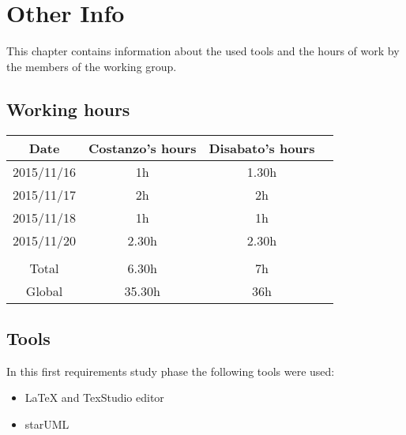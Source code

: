 \documentclass[\mainpath/main]{subfiles}
\begin{document}
\chapter{Other Info}
\label{other_info}

\setmyfancystyle

This chapter contains information about the used tools and the hours of work by the members of the working group.

\section{Working hours}
\begin{table}[h!]
\begin{tabular}{cccc}
\hline
Date & Costanzo's hours & Disabato's hours  &    \\ \hline
2015/11/16 & 1h & 1.30h &    \\ \hline
2015/11/17 & 2h & 2h &    \\ \hline 
2015/11/18 & 1h & 1h &    \\ \hline
2015/11/20 & 2.30h & 2.30h &    \\ \hline \\
Total & 6.30h & 7h & \\ \hline
Global & 35.30h & 36h & \\ \hline

\end{tabular}
\end{table}

\section{Tools}
In this first requirements study phase the following tools were used:
\begin{itemize}
	\item \LaTeX{} and TexStudio editor
	\item starUML
\end{itemize}
\end{document}
